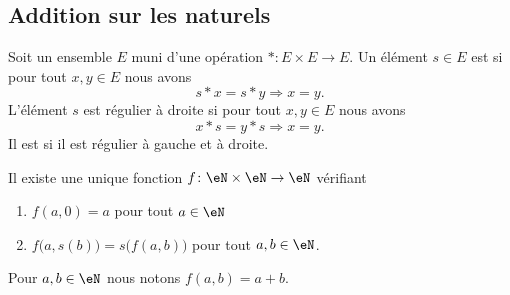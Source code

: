 \subsection{Addition sur les naturels}
\label{SUBooAdditionNaturels}

\begin{definition}        \label{DEFooIJIEooZaAdSs}
	Soit un ensemble \( E\) muni d'une opération \( *\colon E\times E\to E\). Un élément \( s\in E\) est  si pour tout \( x,y\in E\) nous avons
	\begin{equation}
		s*x=s*y\Rightarrow x=y.
	\end{equation}
	L'élément \( s\) est régulier à droite si pour tout \( x,y\in E\) nous avons
	\begin{equation}
		x*s=y*s\Rightarrow x=y.
	\end{equation}
	Il est  si il est régulier à gauche et à droite.
\end{definition}

\begin{propositionDef}      \label{PROPooVFOXooXmwpFh}
	Il existe une unique fonction \( f\colon \eN\times \eN\to \eN\) vérifiant
	\begin{enumerate}
		\item       \label{ITEMooILZSooNYIkYR}
		      \( f(a,0)=a\) pour tout \( a\in \eN\)
		\item       \label{ITEMooZWHQooBAjZyE}
		      \( f\big( a,s(b) \big)=s\big( f(a,b) \big)\) pour tout \( a,b\in \eN\).
	\end{enumerate}
	Pour \( a,b\in \eN\) nous notons \( f(a,b)=a+b\).
\end{propositionDef}

